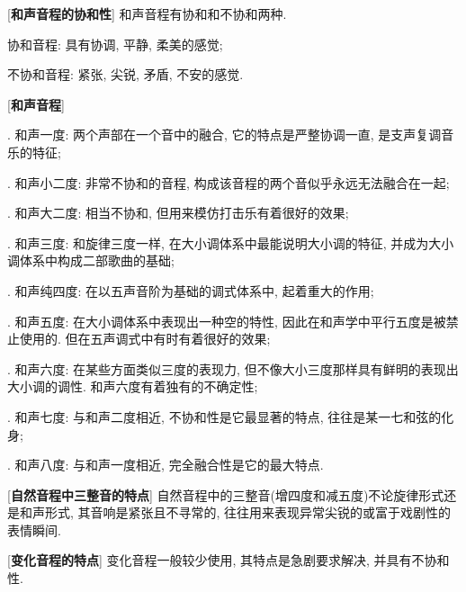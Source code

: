 \clearpage

[\textbf{和声音程的协和性}] 和声音程有协和和不协和两种.\par
\qquad 协和音程: 具有协调, 平静, 柔美的感觉;\par
\qquad 不协和音程: 紧张, 尖锐, 矛盾, 不安的感觉.\par

[\textbf{和声音程}]\par
{}. 和声一度: 两个声部在一个音中的融合, 它的特点是严整协调一直, 是支声复调音乐的特征;\par
{}. 和声小二度: 非常不协和的音程, 构成该音程的两个音似乎永远无法融合在一起;\par
{}. 和声大二度: 相当不协和, 但用来模仿打击乐有着很好的效果;\par
{}. 和声三度: 和旋律三度一样, 在大小调体系中最能说明大小调的特征, 并成为大小调体系中构成二部歌曲的基础;\par
{}. 和声纯四度: 在以五声音阶为基础的调式体系中, 起着重大的作用;\par
{}. 和声五度: 在大小调体系中表现出一种空的特性, 因此在和声学中平行五度是被禁止使用的. 但在五声调式中有时有着很好的效果;\par
{}. 和声六度: 在某些方面类似三度的表现力, 但不像大小三度那样具有鲜明的表现出大小调的调性. 和声六度有着独有的不确定性;\par
{}. 和声七度: 与和声二度相近, 不协和性是它最显著的特点, 往往是某一七和弦的化身;\par
{}. 和声八度: 与和声一度相近, 完全融合性是它的最大特点.\par

[\textbf{自然音程中三整音的特点}] 自然音程中的三整音(增四度和减五度)不论旋律形式还是和声形式, 其音响是紧张且不寻常的, 往往用来表现异常尖锐的或富于戏剧性的表情瞬间.\par

[\textbf{变化音程的特点}] 变化音程一般较少使用, 其特点是急剧要求解决, 并具有不协和性.\par


